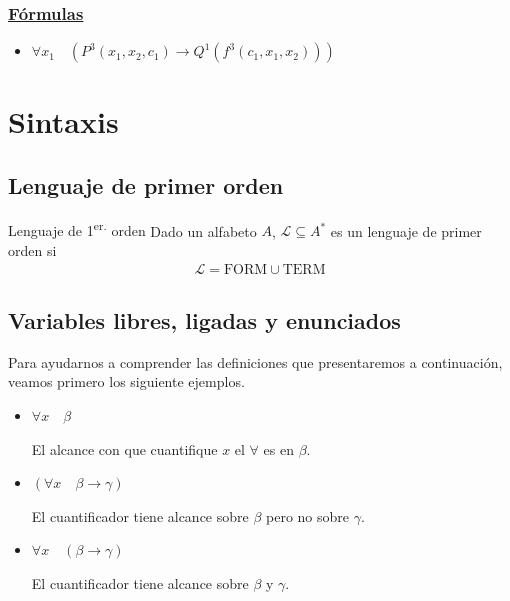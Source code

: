 \subsubsection{\underline{Fórmulas}}

\begin{itemize}
        \item $\forall x_1 \quad (P^{3}(x_1, x_2, c_1) 
            \to Q^{1}(f^{3}(c_1,x_1,x_2)))$
\end{itemize}


\section{Sintaxis} %

\subsection{Lenguaje de primer orden}

\begin{definicion}{Lenguaje de 1\textsuperscript{er.} orden}{}
    Dado un alfabeto $A$, $\mathcal{L} \subseteq A^{*}$ es un lenguaje
    de primer orden si
    \begin{gather*}
        \mathcal{L} = \mathrm{FORM} \cup \mathrm{TERM}
    \end{gather*}
\end{definicion}


\subsection{Variables libres, ligadas y enunciados}

Para ayudarnos a comprender las definiciones que presentaremos a continuación,
veamos primero los siguiente ejemplos.

\begin{itemize}
    \item $\forall x \quad \beta$ %

        El alcance con que cuantifique $x$ el $\forall$ es en $\beta$.

    \item $(\forall x \quad \beta \to \gamma)$

        El cuantificador tiene alcance sobre $\beta$ pero no sobre $\gamma$.

    \item $\forall x \quad (\beta \to \gamma)$

        El cuantificador tiene alcance sobre $\beta$ y $\gamma$.
\end{itemize}

